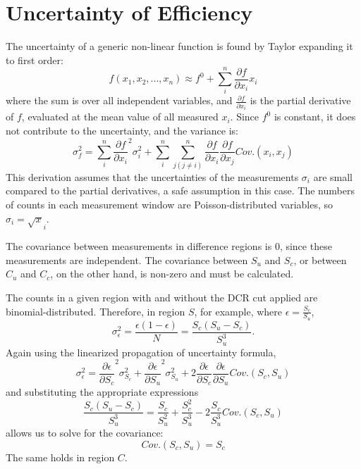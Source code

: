 \section{Uncertainty of Efficiency}
The uncertainty of a generic non-linear function is found by Taylor expanding it to first order:
$$
f(x_1, x_2, ..., x_n) \approx f^0 + \sum_i^n \frac{\partial f}{\partial x_i} x_i
$$
where the sum is over all independent variables, and $\frac{\partial f}{\partial x_i}$ is the partial derivative of $f$, evaluated at the mean value of all measured $x_i$. Since $f^0$ is constant, it does not contribute to the uncertainty, and the variance is:
\begin{equation}
\sigma_f^2 = \sum_i^n \frac{\partial f}{\partial x_i}^2 \sigma_i^2 + \sum_i^n \sum_{j(j\ne i)}^n \frac{\partial f}{\partial x_i}\frac{\partial f}{\partial x_j} Cov.(x_i, x_j)
\label{eqn:form}
\end{equation}
This derivation assumes that the uncertainties of the measurements $\sigma_i$ are small compared to the partial derivatives, a safe assumption in this case. The numbers of counts in each measurement window are Poisson-distributed variables, so $ \sigma_{i} = \sqrt x_i $.

The covariance between measurements in difference regions is 0, since these measurements are independent. The covariance between $S_u$ and $S_c$, or between $C_u$ and $C_c$, on the other hand, is non-zero and must be calculated.

The counts in a given region with and without the DCR cut applied are binomial-distributed. Therefore, in region $S$, for example, where $\epsilon = \frac{S_c}{S_u}$, 
$$
\sigma_{\epsilon}^2 = \frac{\epsilon (1-\epsilon)}{N} = \frac{S_c (S_u - S_c)}{S_u^3} .
$$
Again using the linearized propagation of uncertainty formula, 
$$
\sigma_{\epsilon}^2 = \frac{\partial \epsilon}{\partial S_c}^2 \sigma_{S_c}^2 + \frac{\partial \epsilon}{\partial S_u}^2 \sigma_{S_u}^2 + 2 \frac{\partial \epsilon}{\partial S_c} \frac{\partial \epsilon}{\partial S_u} Cov.(S_c, S_u) 
$$
and substituting the appropriate expressions
$$
\frac{S_c (S_u - S_c)}{S_u^3} = \frac{S_c}{S_u^2} + \frac{S_c^2}{S_u^3} - 2\frac{S_c}{S_u^3} Cov.(S_c, S_u) 
$$
allows us to solve for the covariance:
$$
Cov.(S_c, S_u)  = S_c
$$
The same holds in region $C$. 


